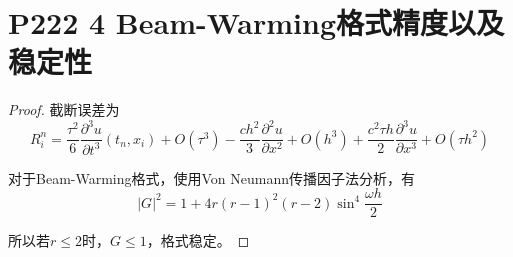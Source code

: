 \documentclass{article}%
\begin{document}
\section{P222 4 Beam-Warming格式精度以及稳定性}

\begin{proof}
截断误差为$$ R^n_i=\frac{\tau^2}{6}\frac{\partial^3u}{\partial t^3}(t_n,x_i)+O(\tau^3)-\frac{ch^2}{3}\frac{\partial^2u}{\partial x^2}+O(h^3)+\frac{c^2\tau h}{2}\frac{\partial^3u}{\partial x^3}+O(\tau h^2) $$

对于Beam-Warming格式，使用Von Neumann传播因子法分析，有$$ \left |G  \right |^2=1+4r(r-1)^2(r-2)\sin^4\frac{\omega h}{2} $$

    所以若$ r \leq 2 $时，$ G \leq 1$，格式稳定。
\end{proof}
\end{document}
